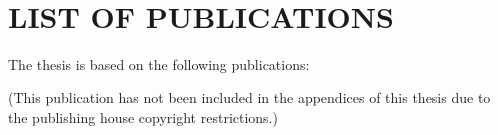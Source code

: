 \newpage


\thispagestyle{empty}
$ \quad $
\newpage


\tableofcontents



\section*{LIST OF PUBLICATIONS} %

\nobibliography*
The thesis is based on the following publications:
\begin{publications}
\item \label{pub:firstPub}  \bibentry{\FirstArticle} 
\item \label{pub:secondPub} \bibentry{\SecondArticle}
\item \label{pub:thirdPub}  \bibentry{\ThirdArticle}
\item \label{pub:fourthPub} \bibentry{\FourthArticle}
\item \label{pub:fifthPub}  \bibentry{\FifthArticle}
\item \label{pub:sixthPub}  \bibentry{\SixthArticle}
\item \label{pub:seventhPub}  \bibentry{\SeventhArticle}
\item \label{pub:eighthPub}  \bibentry{\EighthArticle}
(This publication has not been included in the appendices of this thesis due to the publishing house copyright restrictions.)
\item \label{pub:ninthPub}  \bibentry{\NinthArticle}
\item \label{pub:tenthPub}  \bibentry{\TenthArticle}
\end{publications}


